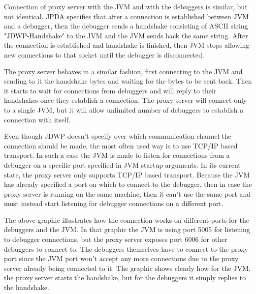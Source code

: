 \documentclass[..thesis.tex]{subfiles}
\begin{document}
Connection of proxy server with the JVM and with the debuggers is similar, but not identical.
JPDA specifies that after a connection is established between JVM and a debugger, then the debugger sends a handshake consisting of ASCII string "JDWP-Handshake" to the JVM and the JVM sends back the same string.
After the connection is established and handshake is finished, then JVM stops allowing new connections to that socket until the debugger is disconnected.

The proxy server behaves in a similar fashion, first connecting to the JVM and sending to it the handshake bytes and waiting for the bytes to be sent back.
Then it starts to wait for connections from debuggers and will reply to their handshakes once they establish a connection.
The proxy server will connect only to a single JVM, but it will allow unlimited number of debuggers to establish a connection with itself.

Even though JDWP doesn't specify over which communication channel the connection should be made, the most often used way is to use TCP/IP based transport.
In such a case the JVM is made to listen for connections from a debugger on a specific port specified in JVM startup arguments.
In its current state, the proxy server only supports TCP/IP based transport.
Because the JVM has already specified a port on which to connect to the debugger, then in case the proxy server is running on the same machine, then it can't use the same port and must instead start listening for debugger connections on a different port.



The above graphic illustrates how the connection works on different ports for the debuggers and the JVM.
In that graphic the JVM is using port 5005 for listening to debugger connections, but the proxy server exposes port 6006 for other debuggers to connect to.
The debuggers themselves have to connect to the proxy port since the JVM port won't accept any more connections due to the proxy server already being connected to it.
The graphic shows clearly how for the JVM, the proxy server starts the handshake, but for the debuggers it simply replies to the handshake.
\end{document}
